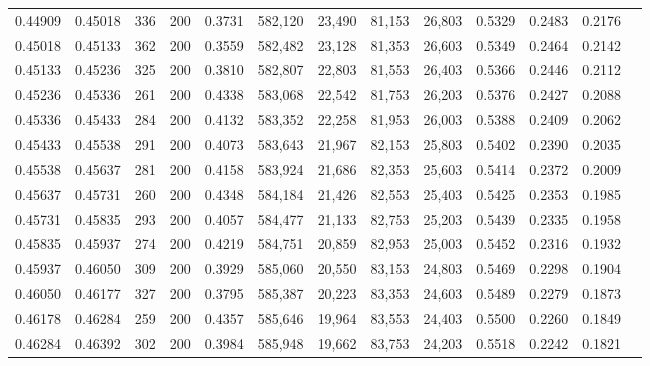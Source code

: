 \begin{tabular}{rrrrrrrrrrrrr}
0.44909 & 0.45018 &    336 & 200 &                                     0.3731 & 582,120 &  23,490 &  81,153 &  26,803 & 0.5329 & 0.2483 & 0.2176 \\
0.45018 & 0.45133 &    362 & 200 &                                     0.3559 & 582,482 &  23,128 &  81,353 &  26,603 & 0.5349 & 0.2464 & 0.2142 \\
0.45133 & 0.45236 &    325 & 200 &                                     0.3810 & 582,807 &  22,803 &  81,553 &  26,403 & 0.5366 & 0.2446 & 0.2112 \\
0.45236 & 0.45336 &    261 & 200 &                                     0.4338 & 583,068 &  22,542 &  81,753 &  26,203 & 0.5376 & 0.2427 & 0.2088 \\
0.45336 & 0.45433 &    284 & 200 &                                     0.4132 & 583,352 &  22,258 &  81,953 &  26,003 & 0.5388 & 0.2409 & 0.2062 \\
0.45433 & 0.45538 &    291 & 200 &                                     0.4073 & 583,643 &  21,967 &  82,153 &  25,803 & 0.5402 & 0.2390 & 0.2035 \\
0.45538 & 0.45637 &    281 & 200 &                                     0.4158 & 583,924 &  21,686 &  82,353 &  25,603 & 0.5414 & 0.2372 & 0.2009 \\
0.45637 & 0.45731 &    260 & 200 &                                     0.4348 & 584,184 &  21,426 &  82,553 &  25,403 & 0.5425 & 0.2353 & 0.1985 \\
0.45731 & 0.45835 &    293 & 200 &                                     0.4057 & 584,477 &  21,133 &  82,753 &  25,203 & 0.5439 & 0.2335 & 0.1958 \\
0.45835 & 0.45937 &    274 & 200 &                                     0.4219 & 584,751 &  20,859 &  82,953 &  25,003 & 0.5452 & 0.2316 & 0.1932 \\
0.45937 & 0.46050 &    309 & 200 &                                     0.3929 & 585,060 &  20,550 &  83,153 &  24,803 & 0.5469 & 0.2298 & 0.1904 \\
0.46050 & 0.46177 &    327 & 200 &                                     0.3795 & 585,387 &  20,223 &  83,353 &  24,603 & 0.5489 & 0.2279 & 0.1873 \\
0.46178 & 0.46284 &    259 & 200 &                                     0.4357 & 585,646 &  19,964 &  83,553 &  24,403 & 0.5500 & 0.2260 & 0.1849 \\
0.46284 & 0.46392 &    302 & 200 &                                     0.3984 & 585,948 &  19,662 &  83,753 &  24,203 & 0.5518 & 0.2242 & 0.1821 \\

\end{tabular}
